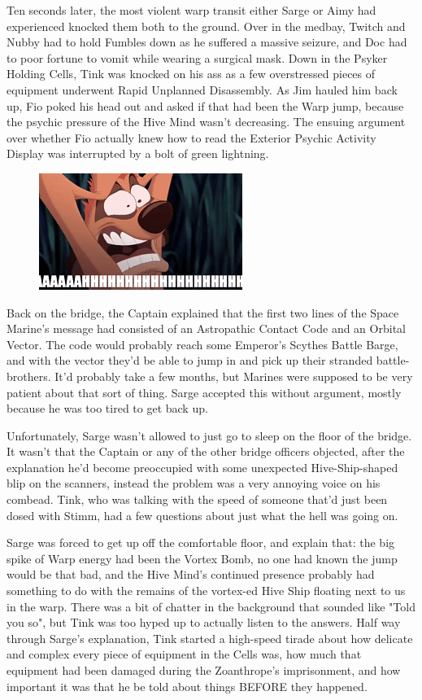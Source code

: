 Ten seconds later, the most violent warp transit either Sarge or Aimy had experienced knocked them both to the ground. 
Over in the medbay, Twitch and Nubby had to hold Fumbles down as he suffered a massive seizure, and Doc had to poor fortune to vomit while wearing a surgical mask. 
Down in the Psyker Holding Cells, Tink was knocked on his ass as a few overstressed pieces of equipment underwent Rapid Unplanned Disassembly. 
As Jim hauled him back up, Fio poked his head out and asked if that had been the Warp jump, because the psychic pressure of the Hive Mind wasn't decreasing. 
The ensuing argument over whether Fio actually knew how to read the Exterior Psychic Activity Display was interrupted by a bolt of green lightning.
\begin{figure}
	\begin{center}
		\includegraphics[width=\figwidth]{pics/12/74.png}
	\end{center}
\end{figure}
Back on the bridge, the Captain explained that the first two lines of the Space Marine's message had consisted of an Astropathic Contact Code and an Orbital Vector. 
The code would probably reach some Emperor's Scythes Battle Barge, and with the vector they'd be able to jump in and pick up their stranded battle-brothers. 
It'd probably take a few months, but Marines were supposed to be very patient about that sort of thing. 
Sarge accepted this without argument, mostly because he was too tired to get back up.

Unfortunately, Sarge wasn't allowed to just go to sleep on the floor of the bridge. 
It wasn't that the Captain or any of the other bridge officers objected, after the explanation he'd become preoccupied with some unexpected Hive-Ship-shaped blip on the scanners, instead the problem was a very annoying voice on his combead. 
Tink, who was talking with the speed of someone that'd just been dosed with Stimm, had a few questions about just what the hell was going on.

Sarge was forced to get up off the comfortable floor, and explain that: 
the big spike of Warp energy had been the Vortex Bomb, no one had known the jump would be that bad, and the Hive Mind's continued presence probably had something to do with the remains of the vortex-ed Hive Ship floating next to us in the warp. 
There was a bit of chatter in the background that sounded like "Told you so", but Tink was too hyped up to actually listen to the answers. 
Half way through Sarge's explanation, Tink started a high-speed tirade about how delicate and complex every piece of equipment in the Cells was, how much that equipment had been damaged during the Zoanthrope's imprisonment, and how important it was that he be told about things BEFORE they happened. 



